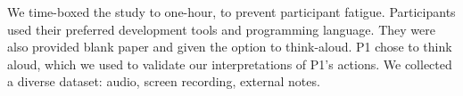 

We time-boxed the study to one-hour, to prevent participant fatigue. Participants used their preferred development tools and programming language. They were also provided blank paper and given the option to think-aloud. P1 chose to think aloud, which we used to validate our interpretations of P1's actions. We collected a diverse dataset: audio, screen recording, external notes.




